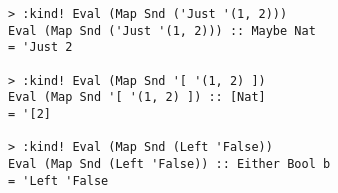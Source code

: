\begin{repl}\begin{lstlisting}
> :kind! Eval (Map Snd ('Just '(1, 2)))
Eval (Map Snd ('Just '(1, 2))) :: Maybe Nat
= 'Just 2

> :kind! Eval (Map Snd '[ '(1, 2) ])
Eval (Map Snd '[ '(1, 2) ]) :: [Nat]
= '[2]

> :kind! Eval (Map Snd (Left 'False))
Eval (Map Snd (Left 'False)) :: Either Bool b
= 'Left 'False\end{lstlisting}\end{repl}
